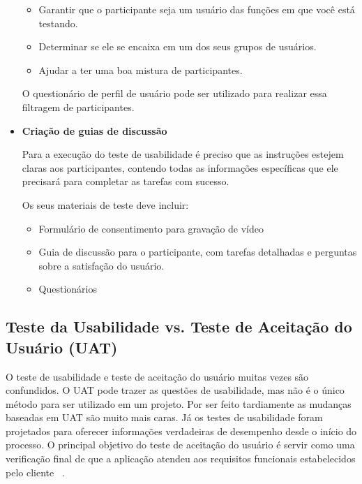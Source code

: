 \begin{itemize}
	\begin{itemize}
	\item Garantir que o participante seja um usuário das funções em que você está testando.
	\item Determinar se ele se encaixa em um dos seus grupos de usuários.
	\item Ajudar a ter uma boa mistura de participantes.
	\end{itemize}

O questionário de perfil de usuário pode ser utilizado para realizar essa filtragem de participantes.


\item \textbf{Criação de guias de discussão}

Para a execução do teste de usabilidade é preciso que as instruções estejem claras aos participantes, contendo todas as informações específicas que ele precisará para completar as tarefas com sucesso.

Os seus materiais de teste deve incluir:

	\begin{itemize}
		\item Formulário de consentimento para gravação de vídeo
		\item Guia de discussão para o participante, com tarefas detalhadas e perguntas sobre a satisfação do usuário.
		\item Questionários
	\end{itemize}

\end{itemize}


\subsection{Teste da Usabilidade vs. Teste de Aceitação do Usuário (UAT)}


O teste de usabilidade e teste de aceitação do usuário muitas vezes são confundidos. O UAT pode trazer as questões de usabilidade, mas não é o único método para ser utilizado em um projeto. Por ser feito tardiamente as mudanças baseadas em UAT são muito mais caras. Já os testes de usabilidade foram projetados para oferecer informações verdadeiras de desempenho desde o início do processo.  
%
O principal objetivo do teste de aceitação do usuário é servir como uma verificação final de que a aplicação atendeu aos requisitos funcionais estabelecidos pelo cliente ~\cite{preece2007}.




